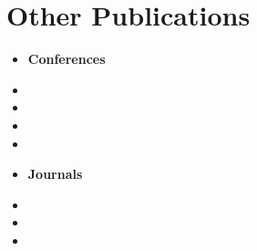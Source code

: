 \chapter{Other Publications}

\begin{itemize}
	\item[] \hspace{0pt plus 1filll}  \textbf{Conferences}
	\item
	\item
	\item
	\item
	
	\item[]  \hspace{0pt plus 1filll}  \textbf{Journals}
	\item
	\item
	\item

\end{itemize}